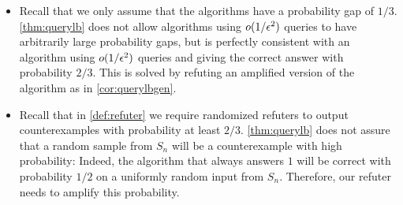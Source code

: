 \begin{itemize}
    \item Recall that we only assume that the algorithms have a probability gap of $1/3$. 
    \cref{thm:querylb} does not allow algorithms using $o(1/\epsilon^2)$ queries
    to have arbitrarily large probability gaps, but is perfectly consistent with an algorithm
    using $o(1/\epsilon^2)$ queries and giving the correct answer with 
    probability $2/3$. This is solved by refuting an amplified version of the algorithm as 
    in \cref{cor:querylbgen}.
    \item Recall that in \cref{def:refuter} we require randomized refuters to output
    counterexamples with probability at least $2/3$. \cref{thm:querylb} does not assure
    that a random sample from $S_n$ will be a counterexample with high probability: 
    Indeed, the algorithm that always answers $1$ will be correct with probability $1/2$ 
    on a uniformly random input from $S_n$. Therefore, our refuter needs to amplify this probability.
\end{itemize}

